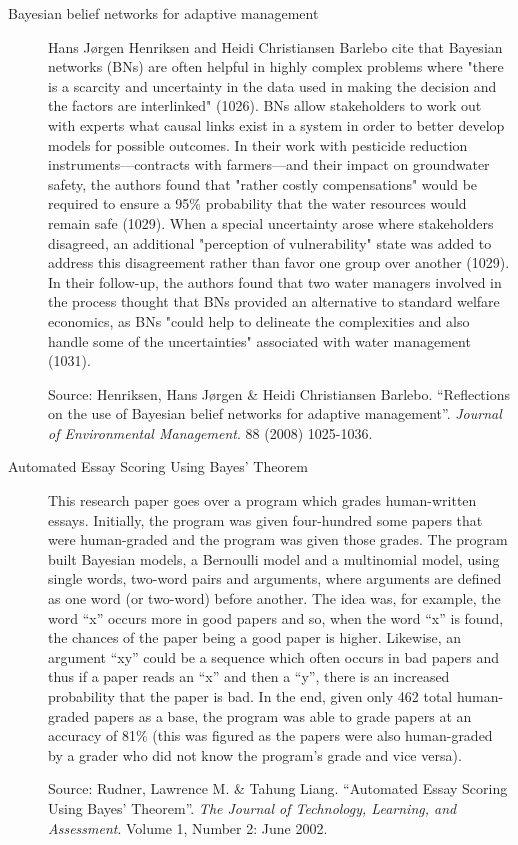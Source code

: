 \documentclass[11pt]{amsart}
\begin{document}
\begin{description}

\item[Bayesian belief networks for adaptive management] Hans Jørgen Henriksen and Heidi Christiansen Barlebo cite that
Bayesian networks (BNs) are often helpful in highly complex problems where "there is a scarcity and uncertainty in the
data used in making the decision and the factors are interlinked" (1026).  BNs allow stakeholders to work out with
experts what causal links exist in a system in order to better develop models for possible outcomes.  In their work
with pesticide reduction instruments\----contracts with farmers\----and their impact on groundwater safety, the authors
found that "rather costly compensations" would be required to ensure a 95\% probability that the water resources would
remain safe (1029).  When a special uncertainty arose where stakeholders disagreed, an additional "perception of
vulnerability" state was added to address this disagreement rather than favor one group over another (1029).  In their
follow-up, the authors found that two water managers involved in the process thought that BNs provided an alternative to
standard welfare economics, as BNs "could help to delineate the complexities and also handle some of the uncertainties"
associated with water management (1031).

Source:
Henriksen, Hans Jørgen \& Heidi Christiansen Barlebo.
``Reflections on the use of Bayesian belief networks for adaptive management''.
\emph{Journal of Environmental Management}.
88 (2008) 1025-1036.

\item[Automated Essay Scoring Using Bayes' Theorem]
This research paper goes over a program which grades human-written essays.
Initially, the program was given four-hundred some papers that were
human-graded and the program was given those grades.  The program built
Bayesian models, a Bernoulli model and a multinomial model, using single words,
two-word pairs and arguments, where arguments are defined as one word (or
two-word) before another.  The idea was, for example, the word ``x'' occurs more
in good papers and so, when the word ``x'' is found, the chances of the paper
being a good paper is higher.  Likewise, an argument ``xy'' could be a sequence
which often occurs in bad papers and thus if a paper reads an ``x'' and then a
``y'', there is an increased probability that the paper is bad.  In the end,
given only 462 total human-graded papers as a base, the program was able to
grade papers at an accuracy of 81\% (this was figured as the papers were also
human-graded by a grader who did not know the program's grade and vice versa).

Source:
Rudner, Lawrence M. \& Tahung Liang.
``Automated Essay Scoring Using Bayes’ Theorem''.
\emph{The Journal of Technology, Learning, and Assessment}.
Volume 1, Number 2: June 2002.

\end{description}
\end{document}
